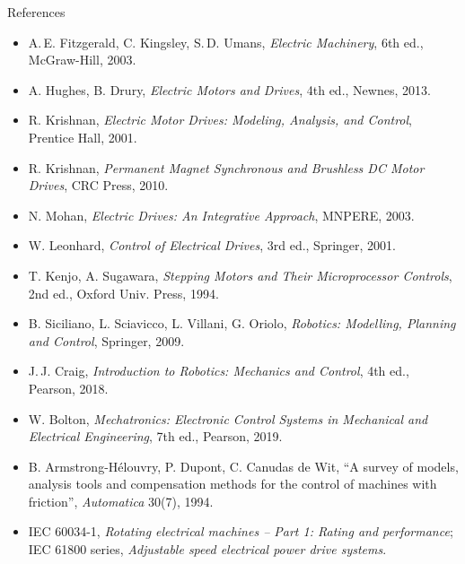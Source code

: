 \documentclass[aspectratio=169,10pt]{beamer}
\begin{document}
\begin{frame}{References}
\scriptsize
\begin{itemize}\setlength\itemsep{1pt}
\item A.\,E. Fitzgerald, C. Kingsley, S.\,D. Umans, \textit{Electric Machinery}, 6th ed., McGraw-Hill, 2003.
\item A. Hughes, B. Drury, \textit{Electric Motors and Drives}, 4th ed., Newnes, 2013.
\item R. Krishnan, \textit{Electric Motor Drives: Modeling, Analysis, and Control}, Prentice Hall, 2001.
\item R. Krishnan, \textit{Permanent Magnet Synchronous and Brushless DC Motor Drives}, CRC Press, 2010.
\item N. Mohan, \textit{Electric Drives: An Integrative Approach}, MNPERE, 2003.
\item W. Leonhard, \textit{Control of Electrical Drives}, 3rd ed., Springer, 2001.
\item T. Kenjo, A. Sugawara, \textit{Stepping Motors and Their Microprocessor Controls}, 2nd ed., Oxford Univ. Press, 1994.
\item B. Siciliano, L. Sciavicco, L. Villani, G. Oriolo, \textit{Robotics: Modelling, Planning and Control}, Springer, 2009.
\item J.\,J. Craig, \textit{Introduction to Robotics: Mechanics and Control}, 4th ed., Pearson, 2018.
\item W. Bolton, \textit{Mechatronics: Electronic Control Systems in Mechanical and Electrical Engineering}, 7th ed., Pearson, 2019.
\item B. Armstrong-H\'elouvry, P. Dupont, C. Canudas de Wit, ``A survey of models, analysis tools and compensation methods for the control of machines with friction'', \textit{Automatica} 30(7), 1994.
\item IEC 60034-1, \textit{Rotating electrical machines -- Part 1: Rating and performance}; IEC 61800 series, \textit{Adjustable speed electrical power drive systems}.
\end{itemize}
\end{frame}
\end{document}
